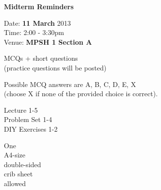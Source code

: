 \begin{cf}{
		\textbf{Midterm Reminders}
}
\end{cf}

\begin{cf}
		Date: \textbf{11 March} 2013\\
		Time: 2:00 - 3:30pm\\
		Venue: \textbf{\color{red} MPSH 1 Section A}\\
\end{cf}

\begin{cf}
MCQs + short questions\\
(practice questions will be posted)
\end{cf}

\begin{cf}
Possible MCQ answers are A, B, C, D, E, X\\
(choose X if none of the provided choice is correct).
\end{cf}

\begin{cf}
Lecture 1-5\\
Problem Set 1-4\\
DIY Exercises 1-2\\
\end{cf}

\begin{cf}
	One\\
	A4-size\\
	double-sided\\
	crib sheet\\
	allowed
\end{cf}
